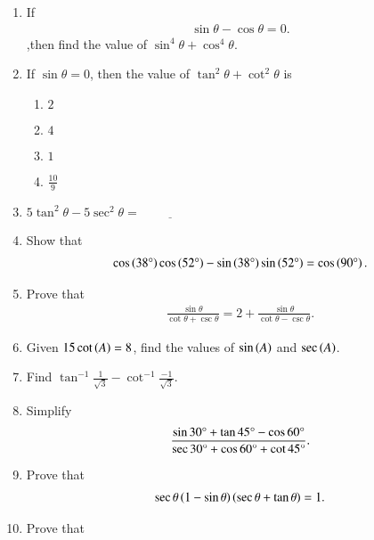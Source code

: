 \begin{enumerate}[label=\thesubsection.\arabic*,ref=\thesubsection.\theenumi,itemsep=1pt]
   \hfill{}\item If
   \begin{align*}
       \sin\theta-\cos\theta=0
   .\end{align*}
   ,then find the value of $\sin^4\theta+\cos^4\theta$.
  \hfill{}
    \item If $\sin \theta=0$, then the value of $\tan^2\theta+\cot^2\theta$ is
    \begin{multicols}{4}
\begin{enumerate}
        \item $2$
        \item $4$
        \item $1$
        \item $\frac{10}{9}$
    \end{enumerate}
\end{multicols}
    \hfill{}\item $5\tan^2 \theta - 5\sec^2\theta = \underline{\hspace{2cm}}$
   \hfill{}\item Show that 
    \begin{align*}
        \cos\left(38\degree\right) \cos\left(52\degree\right) - \sin\left(38\degree\right)\sin\left(52\degree\right) = \cos\left(90\degree\right).
    \end{align*}
    \hfill{}\item Prove that 
    \begin{align*}
        \frac{\sin\theta}{\cot\theta+\csc\theta} = 2+\frac{\sin\theta}{\cot\theta-\csc\theta}.
    \end{align*}
    \hfill{}\item Given 
        $15 \cot \left(A\right) = 8$,
    find the values of $\sin \left(A\right)$ and $\sec \left(A\right)$.
    \hfill{}
\item Find $\tan^{-1}\frac{1}{\sqrt{3}} - \cot^{-1}\frac{-1}{\sqrt{3}}$.
    \hfill{}
\item  Simplify 
\begin{align*}
\frac{\sin 30\degree + \tan 45\degree-\cos 60\degree}{\sec 30\degree + \cos 60\degree + \cot 45\degree} 
.\end{align*}
\hfill{}\item Prove that 
\begin{align*}
 \sec \theta \left(1-\sin\theta\right)\left(\sec\theta+ \tan\theta\right)=1
.\end{align*}
\hfill{}\item Prove that 

\end{enumerate}
